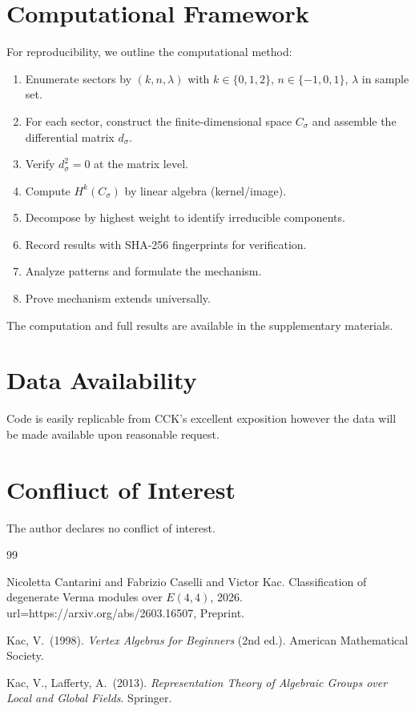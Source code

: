 \documentclass[reqno,10pt]{amsart}
\theoremstyle{plain}
\theoremstyle{definition}
\begin{document}
\appendix

\section{Computational Framework}

For reproducibility, we outline the computational method:

\begin{enumerate}
  \item Enumerate sectors by $(k, n, \lambda)$ with $k \in \{0,1,2\}$, 
        $n \in \{-1,0,1\}$, $\lambda$ in sample set.
  \item For each sector, construct the finite-dimensional space $C_\sigma$ 
        and assemble the differential matrix $d_\sigma$.
  \item Verify $d_\sigma^2 = 0$ at the matrix level.
  \item Compute $H^k(C_\sigma)$ by linear algebra (kernel/image).
  \item Decompose by highest weight to identify irreducible components.
  \item Record results with SHA-256 fingerprints for verification.
  \item Analyze patterns and formulate the mechanism.
  \item Prove mechanism extends universally.
\end{enumerate}

The computation and full results are available in the supplementary materials.
\section*{Data Availability}
Code is easily replicable from CCK's excellent exposition however the data will be made available upon reasonable request.
\section*{Confliuct of Interest}
The author declares no conflict of interest.
\begin{thebibliography}{99}

{
  Nicoletta Cantarini and Fabrizio Caselli and Victor Kac.
      Classification of degenerate Verma modules over $E(4,4)$, 
      2026.
      url={https://arxiv.org/abs/2603.16507}, 
}
\newblock Preprint.

Kac, V.\ (1998).
\textit{Vertex Algebras for Beginners} (2nd ed.).
\newblock American Mathematical Society.

Kac, V., Lafferty, A.\ (2013).
\textit{Representation Theory of Algebraic Groups over Local and Global Fields}.
\newblock Springer.

\end{thebibliography}
\end{document}
